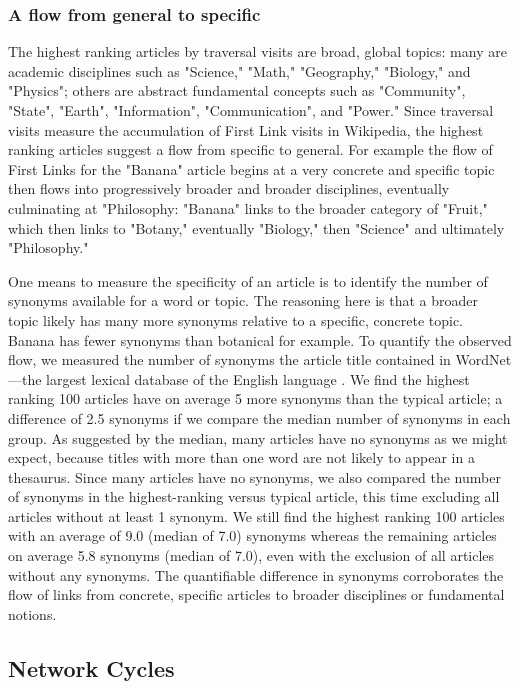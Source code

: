 \documentclass[pre,twocolumn,twoside,superscriptaddress,floatfix, aps, 10pt]{revtex4-1}
\begin{document}
\subsubsection{A flow from general to specific}

The highest ranking articles by traversal visits are 
broad, global topics: 
many are academic disciplines such as "Science," "Math," 
"Geography," "Biology," and "Physics"; others are abstract fundamental concepts such as 
"Community", "State", "Earth", "Information", "Communication", and "Power."
Since traversal visits measure the accumulation of First Link visits in Wikipedia, 
the highest ranking articles suggest a flow from specific to general. 
For example the flow of First Links for the "Banana" article begins at a very concrete
and specific topic then flows into progressively broader and broader disciplines, eventually 
culminating at "Philosophy: "Banana" links to the broader category of "Fruit," which then links to 
"Botany," eventually "Biology," then "Science" and ultimately "Philosophy." 

One means to measure the specificity of an article is to identify the number of synonyms available for a word or topic. The reasoning here is that a  broader topic likely has many more synonyms relative to a specific, concrete topic. Banana has fewer synonyms than botanical for example. To quantify the observed flow, we measured the number of synonyms the article title contained in WordNet---the largest lexical database of the English language 
\cite{wordnet}. 
We find the highest ranking 100 articles have on average 5 more synonyms than the typical article; a difference of 2.5 synonyms if we compare the median number of synonyms in each group. 
As suggested by the median, many articles have no synonyms as we might expect, because titles with more than one word are not likely to appear in a thesaurus. 
Since many articles have no synonyms, we also compared the number of synonyms in the highest-ranking versus typical article, this time excluding all articles without at least 1 synonym. 
We still find the highest ranking 100 articles with an average of 9.0 (median of 7.0) synonyms whereas the remaining articles on average 5.8 synonyms (median of 7.0), even with the exclusion of all articles without any synonyms.
The quantifiable difference in synonyms corroborates the flow of links from concrete, specific articles to broader disciplines or fundamental notions.




\subsection{Network Cycles}
\end{document}
